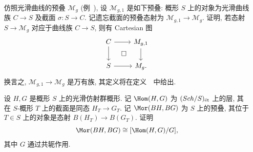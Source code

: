 \begin{exercise}[重要, 有益的练习]\label{src:3.4.42}
仿照光滑曲线的预叠 $\mathcal M_g$ (例~), 设 $\mathcal M_{g,1}$ 是如下预叠: 概形 $S$ 上的对象为光滑曲线族 $C\to S$ 及截面 $\sigma:S\to C$. 记遗忘截面的预叠态射为 $\mathcal M_{g,1}\to\mathcal M_g$. 证明, 若态射 $S\to\mathcal M_g$ 对应于曲线族 $C\to S$, 则有 Cartesian 图
\[
\begin{tikzcd}
C\arrow[r]\arrow[d]\arrow[dr,phantom,"\square"]&\mathcal M_{g,1}\arrow[d]\\
S\arrow[r]&\mathcal M_g.
\end{tikzcd}
\]
换言之, $\mathcal M_{g,1}\to\mathcal M_g$ 是万有族, 其定义将在定义~~中给出.
\end{exercise}
\begin{exercise}[有益的练习]\label{src:3.4.43}
设 $H,G$ 是概形 $S$ 上的光滑仿射群概形. 记 $\Hom(H,G)$ 为 $(Sch/S)_{\text{ét}}$ 上的层, 其在 $S$-概形 $T$ 上的截面是同态 $H_T\to G_T$. 记 $\Mor(BH,BG)$ 为 $S$ 上的预叠, 其位于 $T\in S$ 上的对象是态射 $B(H_T)\to B(G_T)$. 证明
\[
\Mor(BH,BG)\cong[\Hom(H,G)/G],
\]
其中 $G$ 通过共轭作用.
\end{exercise}
